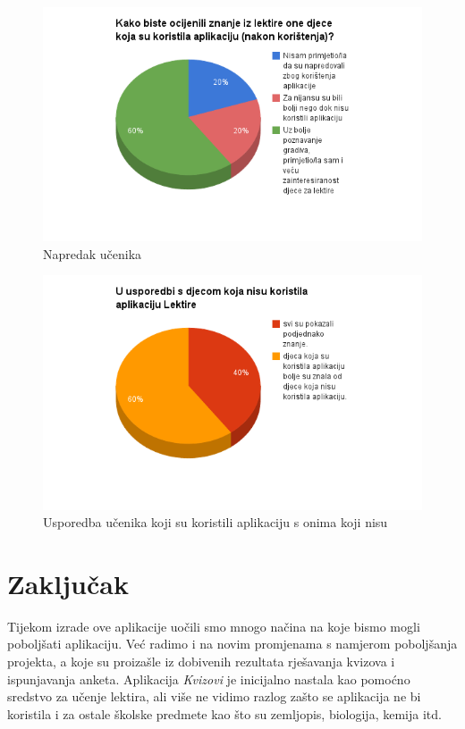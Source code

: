 \documentclass{scrreprt}
\begin{document}
\begin{figure}[H]
  \includegraphics[width=\textwidth, clip=true, trim=0 2.5cm 0 0]{advance}
  \caption{Napredak učenika}
  \label{advance}
\end{figure}

\begin{figure}[H]
  \includegraphics[width=\textwidth, clip=true, trim=0 2.5cm 0 0]{comparison}
  \caption{Usporedba učenika koji su koristili aplikaciju s onima koji nisu}
\end{figure}

\chapter{Zaključak}

Tijekom izrade ove aplikacije uočili smo mnogo načina na koje bismo mogli
poboljšati aplikaciju. Već radimo i na novim promjenama s namjerom poboljšanja
projekta, a koje su proizašle iz dobivenih rezultata rješavanja kvizova i
ispunjavanja anketa. Aplikacija \emph{Kvizovi} je inicijalno nastala kao pomoćno
sredstvo za učenje lektira, ali više ne vidimo razlog zašto se aplikacija ne bi
koristila i za ostale školske predmete kao što su zemljopis, biologija, kemija
itd.
\end{document}
